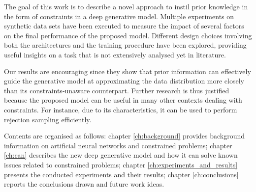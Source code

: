 The goal of this work is to describe a novel approach to instil prior knowledge in the form of constraints in a deep generative model. Multiple experiments on synthetic data sets have been executed to measure the impact of several factors on the final performance of the proposed model. Different design choices involving both the architectures and the training procedure have been explored, providing useful insights on a task that is not extensively analysed yet in literature.

Our results are encouraging since they show that prior information can effectively guide the generative model at approximating the data distribution more closely than its constraints-unaware counterpart. Further research is thus justified because the proposed model can be useful in many other contexts dealing with constraints. For instance, due to its characteristics, it can be used to perform rejection sampling efficiently.

Contents are organised as follows: chapter \ref{ch:background} provides background information on artificial neural networks and constrained problems; chapter \ref{ch:can} describes the new deep generative model and how it can solve known issues related to constrained problems; chapter \ref{ch:experiments_and_results} presents the conducted experiments and their results; chapter \ref{ch:conclusions} reports the conclusions drawn and future work ideas.
